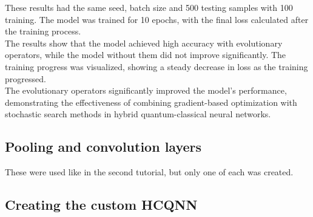 \documentclass[conference]{IEEEtran}
\begin{document}

These results had the same seed, batch size and 500 testing samples with 100 training. The model was trained for 10 epochs, with the final loss calculated after the training process.\\
The results show that the model achieved high accuracy with evolutionary operators, while the model without them did not improve significantly. The training progress was visualized, showing a steady decrease in loss as the training progressed.\\
The evolutionary operators significantly improved the model's performance, demonstrating the effectiveness of combining gradient-based optimization with stochastic search methods in hybrid quantum-classical neural networks.



\subsection*{\fontsize{12}{16}\selectfont Pooling and convolution layers}

These were used like in the second tutorial, but only one of each was created.


\subsection*{\fontsize{12}{16}\selectfont Creating the custom HCQNN}
\end{document}
